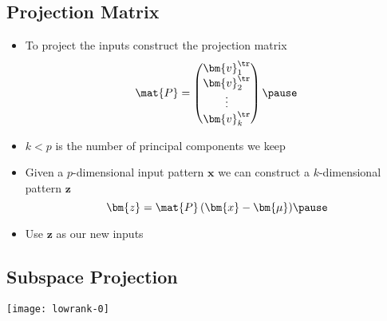 
\begin{slide}
\section[-1]{Projection Matrix}

\begin{PauseHighLight}

\begin{itemize}\squeeze
\item To project the inputs construct the projection matrix
  \begin{displaymath}
    \mat{P} = 
    \begin{pmatrix}
      \bm{v}_1^\tr \\
      \bm{v}_2^\tr \\
      \vdots\\
      \bm{v}_k^\tr
    \end{pmatrix}\pause
  \end{displaymath}
\item $k<p$ is the number of principal components we keep\pause
\item Given a $p$-dimensional input pattern $\bm{x}$ we can construct a
  $k$-dimensional pattern $\bm{z}$
  \begin{displaymath}
    \bm{z} = \mat{P} \, (\bm{x}-\bm{\mu})\pause
  \end{displaymath}
\item Use $\bm{z}$ as our new inputs\pause
\end{itemize}


\end{PauseHighLight}
\end{slide}

\begin{slide}
\section{Subspace Projection}
\pause
\pb
\begin{center}
  \texttt{[image: lowrank-0]}
\end{center}
\end{slide}

